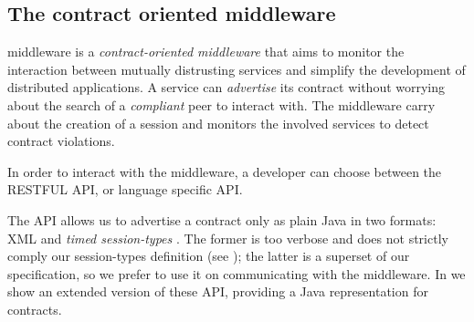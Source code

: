 \subsection{The contract oriented middleware}

\coco middleware  is a \textit{contract-oriented middleware} \cite{CO2middleware}
that aims to monitor the interaction between mutually distrusting
services and simplify the development of distributed applications.
%
A service can \textit{advertise} its contract without worrying about
the search of a \textit{compliant} peer to interact with. The
middleware carry about the creation of a session and monitors the
involved services to detect contract violations.

In order to interact with the middleware, a developer can choose
between the RESTFUL API, or language specific API.

The API allows us to advertise a contract only as plain Java
 in two formats: XML and \textit{timed
  session-types} \cite{Bartoletti15forte}. The former is too verbose
and does not strictly comply our session-types definition (see
); the latter is a superset of our
specification, so we prefer to use it on communicating with the
middleware.
In  we show an extended version of these API,
providing a Java representation for contracts.

